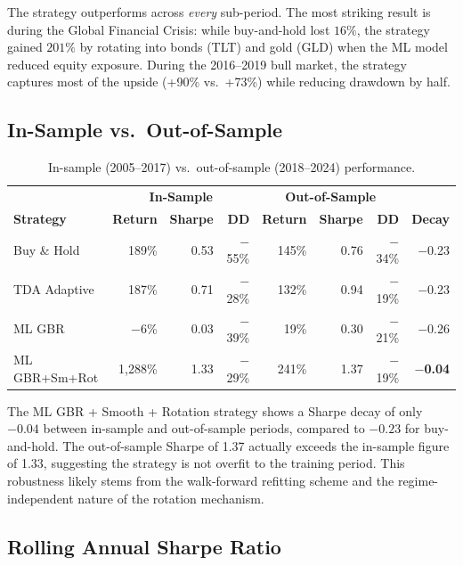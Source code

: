 \documentclass[11pt, a4paper]{article}
\begin{document}
The strategy outperforms across \emph{every} sub-period. The most striking result is during the Global Financial Crisis: while buy-and-hold lost $16\%$, the strategy gained $201\%$ by rotating into bonds (TLT) and gold (GLD) when the ML model reduced equity exposure. During the 2016--2019 bull market, the strategy captures most of the upside (+90\% vs.\ +73\%) while reducing drawdown by half.

\subsection{In-Sample vs.\ Out-of-Sample}

\begin{table}[H]
\centering
\caption{In-sample (2005--2017) vs.\ out-of-sample (2018--2024) performance.}
\label{tab:isoos}
\begin{tabular}{l|rrr|rrr|r}
\toprule
 & \multicolumn{3}{c|}{\textbf{In-Sample}} & \multicolumn{3}{c|}{\textbf{Out-of-Sample}} & \\
\textbf{Strategy} & \textbf{Return} & \textbf{Sharpe} & \textbf{DD} & \textbf{Return} & \textbf{Sharpe} & \textbf{DD} & \textbf{Decay} \\
\midrule
Buy \& Hold       & 189\%    & 0.53 & $-$55\% & 145\%  & 0.76 & $-$34\% & $-$0.23 \\
TDA Adaptive      & 187\%    & 0.71 & $-$28\% & 132\%  & 0.94 & $-$19\% & $-$0.23 \\
ML GBR            & $-$6\%   & 0.03 & $-$39\% & 19\%   & 0.30 & $-$21\% & $-$0.26 \\
ML GBR+Sm+Rot     & 1{,}288\% & 1.33 & $-$29\% & 241\%  & 1.37 & $-$19\% & \textbf{$-$0.04} \\
\bottomrule
\end{tabular}
\end{table}

The ML GBR + Smooth + Rotation strategy shows a Sharpe decay of only $-0.04$ between in-sample and out-of-sample periods, compared to $-0.23$ for buy-and-hold. The out-of-sample Sharpe of 1.37 actually exceeds the in-sample figure of 1.33, suggesting the strategy is not overfit to the training period. This robustness likely stems from the walk-forward refitting scheme and the regime-independent nature of the rotation mechanism.

\subsection{Rolling Annual Sharpe Ratio}
\end{document}
